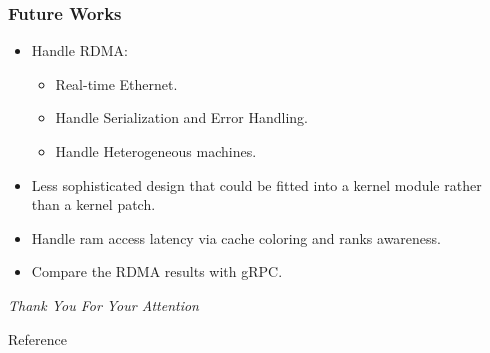 \documentclass{beamer}
\begin{document}
\begin{frame}
    \frametitle{Future Works}
    \begin{itemize}
        \item Handle RDMA:
            \begin{itemize}
                \item Real-time Ethernet.
                \item Handle Serialization and Error Handling.
                \item Handle Heterogeneous machines.
            \end{itemize}
        \item Less sophisticated design that could be fitted into a kernel
            module rather than a kernel patch.
        \item Handle ram access latency via cache coloring and ranks
            awareness.
        \item Compare the RDMA results with gRPC.
    \end{itemize}
\end{frame}

\begin{frame}
  \centering \Large
  \emph{Thank You For Your Attention}
\end{frame}

\begin{frame}{Reference}
    
     
\end{frame}
\end{document}
